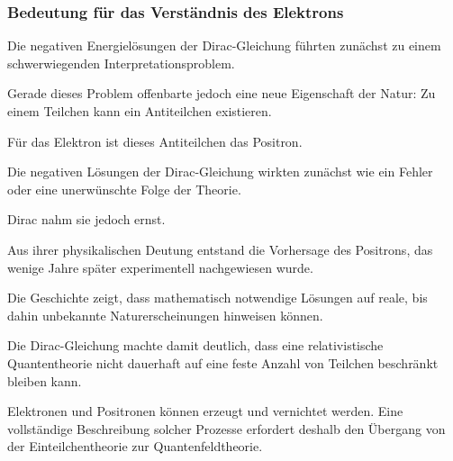 \subsubsection*{Bedeutung für das Verständnis des Elektrons}

Die negativen Energielösungen der Dirac-Gleichung führten zunächst zu
einem schwerwiegenden Interpretationsproblem.

Gerade dieses Problem offenbarte jedoch eine neue Eigenschaft der
Natur: Zu einem Teilchen kann ein Antiteilchen existieren.

Für das Elektron ist dieses Antiteilchen das Positron.

\begin{HistoryBox}
	\label{box:mathematische_schwierigkeit_entdeckung_positron}
	
	Die negativen Lösungen der Dirac-Gleichung wirkten zunächst wie ein
	Fehler oder eine unerwünschte Folge der Theorie.
	
	Dirac nahm sie jedoch ernst.
	
	Aus ihrer physikalischen Deutung entstand die Vorhersage des Positrons,
	das wenige Jahre später experimentell nachgewiesen wurde.
	
	Die Geschichte zeigt, dass mathematisch notwendige Lösungen auf reale,
	bis dahin unbekannte Naturerscheinungen hinweisen können.
\end{HistoryBox}

Die Dirac-Gleichung machte damit deutlich, dass eine relativistische
Quantentheorie nicht dauerhaft auf eine feste Anzahl von Teilchen
beschränkt bleiben kann.

Elektronen und Positronen können erzeugt und vernichtet werden. Eine
vollständige Beschreibung solcher Prozesse erfordert deshalb den
Übergang von der Einteilchentheorie zur Quantenfeldtheorie.

